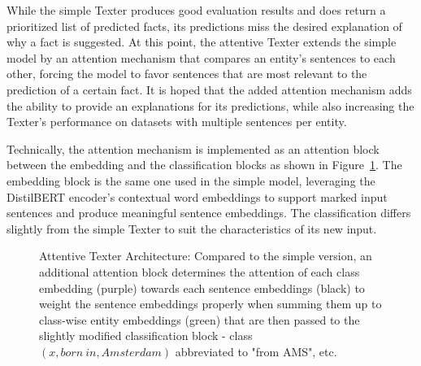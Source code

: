 While the simple Texter produces good evaluation results and does return a prioritized list of predicted facts, its predictions miss the desired explanation of why a fact is suggested. At this point, the attentive Texter extends the simple model by an attention mechanism that compares an entity's sentences to each other, forcing the model to favor sentences that are most relevant to the prediction of a certain fact. It is hoped that the added attention mechanism adds the ability to provide an explanations for its predictions, while also increasing the Texter's performance on datasets with multiple sentences per entity.

Technically, the attention mechanism is implemented as an attention block between the embedding and the classification blocks as shown in Figure~\ref{fig:4_approach/1_texter/2_attention_model/attention_architecture}. The embedding block is the same one used in the simple model, leveraging the DistilBERT encoder's contextual word embeddings to support marked input sentences and produce meaningful sentence embeddings. The classification differs slightly from the simple Texter to suit the characteristics of its new input.

\begin{figure}[t]
    \caption{Attentive Texter Architecture: Compared to the simple version, an additional attention block determines the attention of each class embedding (purple) towards each sentence embeddings (black) to weight the sentence embeddings properly when summing them up to class-wise entity embeddings (green) that are then passed to the slightly modified classification block - class $(x, born~in, Amsterdam)$ abbreviated to "from AMS", etc.}
    \label{fig:4_approach/1_texter/2_attention_model/attention_architecture}
\end{figure}

